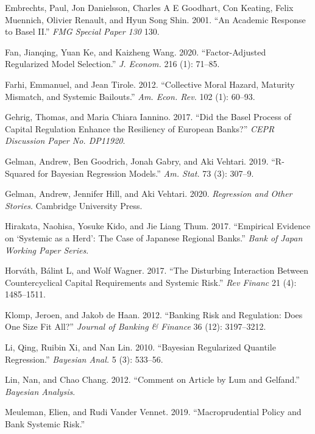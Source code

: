 \documentclass[
  10pt,
]{article}
\begin{document}
\leavevmode\hypertarget{ref-Embrechts2001}{}%
Embrechts, Paul, Jon Danielsson, Charles A E Goodhart, Con Keating,
Felix Muennich, Olivier Renault, and Hyun Song Shin. 2001. ``An Academic
Response to Basel II.'' \emph{FMG Special Paper 130} 130.

\leavevmode\hypertarget{ref-Fan2020}{}%
Fan, Jianqing, Yuan Ke, and Kaizheng Wang. 2020. ``Factor-Adjusted
Regularized Model Selection.'' \emph{J. Econom.} 216 (1): 71--85.

\leavevmode\hypertarget{ref-Farhi2012}{}%
Farhi, Emmanuel, and Jean Tirole. 2012. ``Collective Moral Hazard,
Maturity Mismatch, and Systemic Bailouts.'' \emph{Am. Econ. Rev.} 102
(1): 60--93.

\leavevmode\hypertarget{ref-Gehrig2017}{}%
Gehrig, Thomas, and Maria Chiara Iannino. 2017. ``Did the Basel Process
of Capital Regulation Enhance the Resiliency of European Banks?''
\emph{CEPR Discussion Paper No. DP11920}.

\leavevmode\hypertarget{ref-Gelman2019}{}%
Gelman, Andrew, Ben Goodrich, Jonah Gabry, and Aki Vehtari. 2019.
``R-Squared for Bayesian Regression Models.'' \emph{Am. Stat.} 73 (3):
307--9.

\leavevmode\hypertarget{ref-Gelman2020}{}%
Gelman, Andrew, Jennifer Hill, and Aki Vehtari. 2020. \emph{Regression
and Other Stories}. Cambridge University Press.

\leavevmode\hypertarget{ref-Hirakata2017}{}%
Hirakata, Naohisa, Yosuke Kido, and Jie Liang Thum. 2017. ``Empirical
Evidence on `Systemic as a Herd': The Case of Japanese Regional Banks.''
\emph{Bank of Japan Working Paper Series}.

\leavevmode\hypertarget{ref-Horvath2017}{}%
Horváth, Bálint L, and Wolf Wagner. 2017. ``The Disturbing Interaction
Between Countercyclical Capital Requirements and Systemic Risk.''
\emph{Rev Financ} 21 (4): 1485--1511.

\leavevmode\hypertarget{ref-Klomp2012}{}%
Klomp, Jeroen, and Jakob de Haan. 2012. ``Banking Risk and Regulation:
Does One Size Fit All?'' \emph{Journal of Banking \& Finance} 36 (12):
3197--3212.

\leavevmode\hypertarget{ref-Li2010}{}%
Li, Qing, Ruibin Xi, and Nan Lin. 2010. ``Bayesian Regularized Quantile
Regression.'' \emph{Bayesian Anal.} 5 (3): 533--56.

\leavevmode\hypertarget{ref-Lin2012}{}%
Lin, Nan, and Chao Chang. 2012. ``Comment on Article by Lum and
Gelfand.'' \emph{Bayesian Analysis}.

\leavevmode\hypertarget{ref-Meuleman2019}{}%
Meuleman, Elien, and Rudi Vander Vennet. 2019. ``Macroprudential Policy
and Bank Systemic Risk.''
\end{document}
